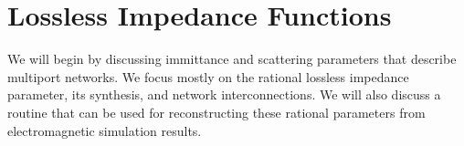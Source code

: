 \chapter{Lossless Impedance Functions}\label{chapter:lossless_impedance}
We will begin by discussing immittance and scattering parameters that describe multiport networks. We focus mostly on the rational lossless impedance parameter, its synthesis, and network interconnections. We will also discuss a routine that can be used for reconstructing these rational parameters from electromagnetic simulation results.




